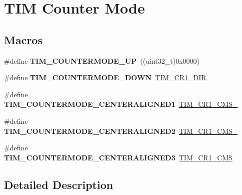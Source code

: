 \hypertarget{group___t_i_m___counter___mode}{}\section{T\+IM Counter Mode}
\label{group___t_i_m___counter___mode}
\subsection*{Macros}
\begin{DoxyCompactItemize}
\item 
\#define {\bfseries T\+I\+M\+\_\+\+C\+O\+U\+N\+T\+E\+R\+M\+O\+D\+E\+\_\+\+UP}~((uint32\+\_\+t)0x0000)\hypertarget{group___t_i_m___counter___mode_ga9eb9ab91119c2c76d4db453d599c0b7d}{}\label{group___t_i_m___counter___mode_ga9eb9ab91119c2c76d4db453d599c0b7d}

\item 
\#define {\bfseries T\+I\+M\+\_\+\+C\+O\+U\+N\+T\+E\+R\+M\+O\+D\+E\+\_\+\+D\+O\+WN}~\hyperlink{group___peripheral___registers___bits___definition_gacea10770904af189f3aaeb97b45722aa}{T\+I\+M\+\_\+\+C\+R1\+\_\+\+D\+IR}\hypertarget{group___t_i_m___counter___mode_ga5f590fdd7c41df7180b870bb76ff691c}{}\label{group___t_i_m___counter___mode_ga5f590fdd7c41df7180b870bb76ff691c}

\item 
\#define {\bfseries T\+I\+M\+\_\+\+C\+O\+U\+N\+T\+E\+R\+M\+O\+D\+E\+\_\+\+C\+E\+N\+T\+E\+R\+A\+L\+I\+G\+N\+E\+D1}~\hyperlink{group___peripheral___registers___bits___definition_ga83ca6f7810aba73dc8c12f22092d97a2}{T\+I\+M\+\_\+\+C\+R1\+\_\+\+C\+M\+S\+\_}\hypertarget{group___t_i_m___counter___mode_ga26d8e5236c35d85c2abaa482b5ec6746}{}\label{group___t_i_m___counter___mode_ga26d8e5236c35d85c2abaa482b5ec6746}

\item 
\#define {\bfseries T\+I\+M\+\_\+\+C\+O\+U\+N\+T\+E\+R\+M\+O\+D\+E\+\_\+\+C\+E\+N\+T\+E\+R\+A\+L\+I\+G\+N\+E\+D2}~\hyperlink{group___peripheral___registers___bits___definition_gab3ee4adcde3c001d3b97d2eae1730ea9}{T\+I\+M\+\_\+\+C\+R1\+\_\+\+C\+M\+S\+\_}\hypertarget{group___t_i_m___counter___mode_gae4517c68086ffa61a694576cec8fe634}{}\label{group___t_i_m___counter___mode_gae4517c68086ffa61a694576cec8fe634}

\item 
\#define {\bfseries T\+I\+M\+\_\+\+C\+O\+U\+N\+T\+E\+R\+M\+O\+D\+E\+\_\+\+C\+E\+N\+T\+E\+R\+A\+L\+I\+G\+N\+E\+D3}~\hyperlink{group___peripheral___registers___bits___definition_ga352b3c389bde13dd6049de0afdd874f1}{T\+I\+M\+\_\+\+C\+R1\+\_\+\+C\+MS}\hypertarget{group___t_i_m___counter___mode_gaf0c3edf6ea1ade3520ab4970e1fc6e92}{}\label{group___t_i_m___counter___mode_gaf0c3edf6ea1ade3520ab4970e1fc6e92}

\end{DoxyCompactItemize}


\subsection{Detailed Description}
